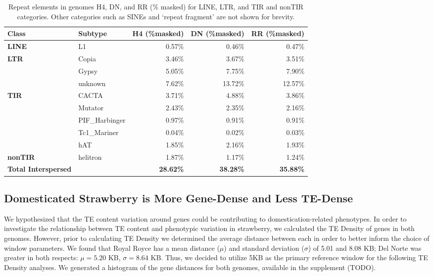 \documentclass[fleqn,10pt]{olplainarticle}
\begin{document}
\begin{table}[ht]
\centering
\begin{tabularx}{\textwidth}{l|X|r|r|r}
\toprule
\textbf{Class} & \textbf{Subtype} & \textbf{H4 (\%masked)} & \textbf{DN (\%masked)} & \textbf{RR (\%masked)} \\
\toprule
\textbf{LINE} & L1 & 0.57\% & 0.46\% & 0.47\% \\
\textbf{LTR} & Copia & 3.46\% & 3.67\% & 3.51\% \\
& Gypsy & 5.05\% & 7.75\% & 7.90\% \\
& unknown & 7.62\% & 13.72\% & 12.57\% \\
\textbf{TIR} & CACTA & 3.71\% & 4.88\% & 3.86\% \\
& Mutator & 2.43\% & 2.35\% & 2.16\% \\
& PIF\_Harbinger & 0.97\% & 0.91\% & 0.91\% \\
& Tc1\_Mariner & 0.04\% & 0.02\% & 0.03\% \\
& hAT & 1.85\% & 2.16\% & 1.93\% \\
\textbf{nonTIR} & helitron & 1.87\% & 1.17\% & 1.24\% \\
\toprule
\textbf{Total Interspersed} & & \textbf{28.62\%} & \textbf{38.28\%} & \textbf{35.88\%} \\
\bottomrule
\end{tabularx}
\caption{Repeat elements in genomes H4, DN, and RR (\% masked) for LINE, LTR, and TIR and nonTIR categories. Other categories such as SINEs and `repeat fragment' are not shown for brevity.}
\label{tab:genomes_combined_reduced}
\end{table}

\subsection{Domesticated Strawberry is More Gene-Dense and Less TE-Dense}
We hypothesized that the TE content variation around genes could be contributing to domestication-related phenotypes.
In order to investigate the relationship between TE content and phenotypic variation in strawberry, we calculated the TE Density of genes in both genomes.
However, prior to calculating TE Density we determined the average distance between each in order to better inform the choice of window parameters.
We found that Royal Royce has a mean distance ($\mu$) and standard deviation ($\sigma$) of 5.01 and 8.08 KB; Del Norte was greater in both respects: $\mu = 5.20$ KB, $\sigma = 8.64$ KB.
Thus, we decided to utilize 5KB as the primary reference window for the following TE Density analyses.
We generated a histogram of the gene distances for both genomes, available in the supplement (TODO).
\end{document}
